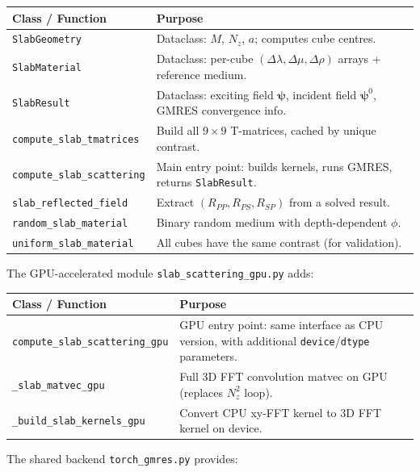 \documentclass[11pt,a4paper]{article}
\newcommand{\D}{\Delta}
\begin{document}
\begin{center}
\renewcommand{\arraystretch}{1.2}
\begin{tabular}{lp{8.5cm}}
\toprule
\textbf{Class / Function} & \textbf{Purpose} \\
\midrule
\texttt{SlabGeometry} &
  Dataclass: $M$, $N_z$, $a$; computes cube centres. \\
\texttt{SlabMaterial} &
  Dataclass: per-cube $(\D\lambda, \D\mu, \D\rho)$ arrays
  + reference medium. \\
\texttt{SlabResult} &
  Dataclass: exciting field $\bm{\psi}$, incident field $\bm{\psi}^0$,
  GMRES convergence info. \\
\midrule
\texttt{compute\_slab\_tmatrices} &
  Build all $9 \times 9$ T-matrices, cached by unique contrast. \\
\texttt{compute\_slab\_scattering} &
  Main entry point: builds kernels, runs GMRES, returns
  \texttt{SlabResult}. \\
\texttt{slab\_reflected\_field} &
  Extract $(R_{PP}, R_{PS}, R_{SP})$ from a solved result. \\
\midrule
\texttt{random\_slab\_material} &
  Binary random medium with depth-dependent $\phi$. \\
\texttt{uniform\_slab\_material} &
  All cubes have the same contrast (for validation). \\
\bottomrule
\end{tabular}
\end{center}

\noindent
The GPU-accelerated module \texttt{slab\_scattering\_gpu.py} adds:

\begin{center}
\renewcommand{\arraystretch}{1.2}
\begin{tabular}{lp{8.5cm}}
\toprule
\textbf{Class / Function} & \textbf{Purpose} \\
\midrule
\texttt{compute\_slab\_scattering\_gpu} &
  GPU entry point: same interface as CPU version, with
  additional \texttt{device}/\texttt{dtype} parameters. \\
\texttt{\_slab\_matvec\_gpu} &
  Full 3D FFT convolution matvec on GPU (replaces
  $N_z^2$ loop). \\
\texttt{\_build\_slab\_kernels\_gpu} &
  Convert CPU xy-FFT kernel to 3D FFT kernel on device. \\
\bottomrule
\end{tabular}
\end{center}

\noindent
The shared backend \texttt{torch\_gmres.py} provides:
\end{document}
